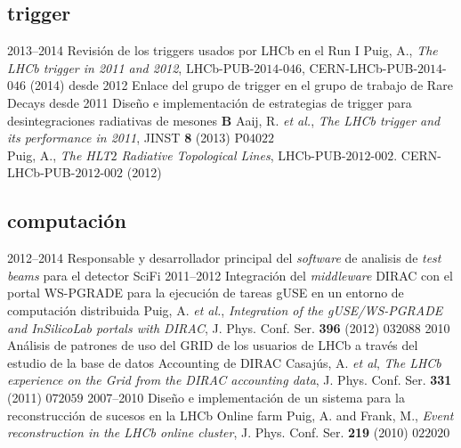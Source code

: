 \subsection{trigger}
    \cventry
    {2013--2014}
    {Revisión de los triggers usados por LHCb en el Run I}
    {}
    {Puig, A., \textit{The LHCb trigger in 2011 and 2012}, LHCb-PUB-$2014$-$046$, CERN-LHCb-PUB-$2014$-$046$ (2014)}
    \cventry
    {desde 2012}
    {Enlace del grupo de trigger en el grupo de trabajo de Rare Decays}
    {}
    {}
    \cventry
    {desde 2011}
    {Diseño e implementación de estrategias de trigger para desintegraciones radiativas de mesones $\mathbf{B}$}
    {}
    {Aaij, R. \textit{et al.}, \textit{The LHCb trigger and its performance in 2011}, JINST \textbf{8} (2013) P$04022$\\
     Puig, A., \textit{The HLT$2$ Radiative Topological Lines}, LHCb-PUB-$2012$-$002$. CERN-LHCb-PUB-$2012$-$002$ (2012)}

\subsection{computación}
    \cventry
    {2012--2014}
    {Responsable y desarrollador principal del \emph{software} de analisis de \emph{test beams} para el detector SciFi}
    {}
    {}
    \cventry
    {2011--2012}
    {Integración del \emph{middleware} DIRAC con el portal WS-PGRADE para la ejecución de tareas gUSE en un entorno de computación distribuida}
    {}
    {Puig, A. \emph{et al.}, \textit{Integration of the gUSE/WS-PGRADE and InSilicoLab portals with DIRAC}, J. Phys. Conf. Ser. \textbf{396} (2012) $032088$}
    \cventry
    {2010}
    {Análisis de patrones de uso del GRID de los usuarios de LHCb a través del estudio de la base de datos Accounting de DIRAC}
    {}
    {Casaj{\'u}s, A. \emph{et al}, \textit{The LHCb experience on the Grid from the DIRAC accounting data}, J. Phys. Conf. Ser. \textbf{331} (2011) $072059$}
    \cventry
    {2007--2010}
    {Diseño e implementación de un sistema para la reconstrucción de sucesos en la LHCb Online farm}
    {}
    {Puig, A. and Frank, M., \textit{Event reconstruction in the LHCb online cluster}, J. Phys. Conf. Ser. \textbf{219} (2010) $022020$}

